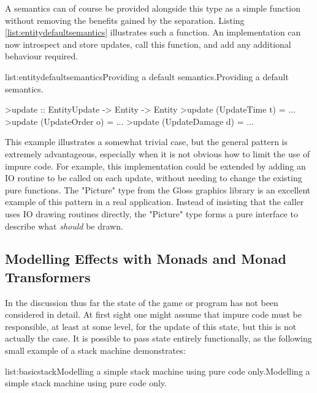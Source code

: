 A semantics can of course be provided alongside this type as a simple function without removing the benefits gained by the separation. Listing \ref{list:entitydefaultsemantics} illustrates such a function. An implementation can now introspect and store updates, call this function, and add any additional behaviour required.

\vspace{-0.5em}
\begin{listing}{list:entitydefaultsemantics}{Providing a default semantics.}{Providing a default semantics.}{}
\end{listing}\vspace{-1.5em}

\begin{haskell}

>update :: EntityUpdate -> Entity -> Entity
>update (UpdateTime t) = ...
>update (UpdateOrder o) = ...
>update (UpdateDamage d) = ...

\end{haskell}
\noindent This example illustrates a somewhat trivial case, but the general pattern is extremely advantageous, especially when it is not obvious how to limit the use of impure code. For example, this implementation could be extended by adding an IO routine to be called on each update, without needing to change the existing pure functions. 
The "Picture" type from the Gloss graphics library is an excellent example of this pattern in a real application. Instead of insisting that the caller uses IO drawing routines directly, the "Picture" type forms a pure interface to describe what \emph{should} be drawn.

\subsection{Modelling Effects with Monads and Monad Transformers}

In the discussion thus far the state of the game or program has not been considered in detail. At first sight one might assume that impure code must be responsible, at least at some level, for the update of this state, but this is not actually the case. It is possible to pass state entirely functionally, as the following small example of a stack machine demonstrates:

\vspace{-0.5em}
\begin{listing}{list:basicstack}{Modelling a simple stack machine using pure code only.}{Modelling a simple stack machine using pure code only.}{}
\end{listing}\vspace{-1.5em}

